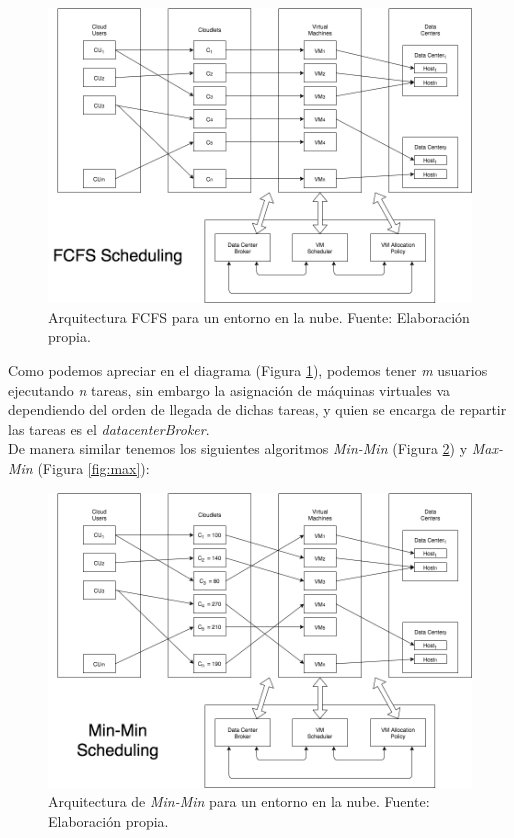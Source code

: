 \setcounter{figure}{4}
\renewcommand\thefigure{\arabic{figure}}
\begin{figure}[h!]
	\centering
	\includegraphics[scale=0.4]{media/imagentres}
	\caption{Arquitectura FCFS para un entorno en la nube. Fuente: Elaboraci\'on propia.}
	\label{fig:fcfs}
\end{figure}

Como podemos apreciar en el diagrama (Figura \ref{fig:fcfs}), podemos tener \emph{m} usuarios ejecutando \emph{n} tareas, sin embargo la asignaci\'on de m\'aquinas virtuales va dependiendo del orden de llegada de dichas tareas, y quien se encarga de repartir las tareas es el \textit{datacenterBroker}. \\

De manera similar tenemos los siguientes algoritmos \textit{Min-Min} (Figura \ref{fig:min}) y \textit{Max-Min} (Figura \ref{fig:max}):

\newpage

\setcounter{figure}{5}
\renewcommand\thefigure{\arabic{figure}}
\begin{figure}[h!]
	\centering
	\includegraphics[scale=0.5]{media/imagencinco}
	\caption{Arquitectura de \textit{Min-Min} para un entorno en la nube. Fuente: Elaboraci\'on propia.}
	\label{fig:min}
\end{figure}


